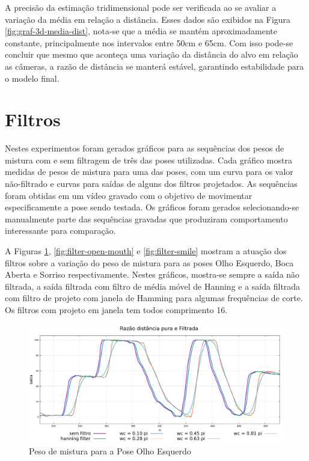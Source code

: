 A precisão da estimação tridimensional pode ser verificada ao se avaliar a
variação da média em relação a distância. Esses dados são exibidos na Figura
\ref{fig:graf-3d-media-dist}, nota-se que a média se mantém aproximadamente
constante, principalmente nos intervalos entre 50cm e 65cm. Com isso pode-se
concluir que mesmo que aconteça uma variação da distância do alvo em relação as
câmeras, a razão de distância se manterá estável, garantindo estabilidade para o
modelo final.

\section{Filtros}

Nestes experimentos foram gerados gráficos para as sequências dos pesos de
mistura com e sem filtragem de três das poses utilizadas. Cada gráfico mostra
medidas de pesos de mistura para uma das poses, com um curva para os valor
não-filtrado e curvas para saídas de alguns dos filtros projetados.  As
sequências foram obtidas em um vídeo gravado com o objetivo de movimentar
especificamente a pose sendo testada. Os gráficos foram gerados selecionando-se
manualmente parte das sequências gravadas que produziram comportamento
interessante para comparação.

A Figuras \ref{fig:filter-left-eye}, \ref{fig:filter-open-mouth} e
\ref{fig:filter-smile} mostram a atuação dos filtros sobre a variação do peso de
mistura para as poses Olho Esquerdo, Boca Aberta e Sorriso respectivamente.
Nestes gráficos, mostra-se sempre a saída não filtrada, a saída filtrada com
filtro de média móvel de Hanning e a saída filtrada com filtro de projeto com
janela de Hamming para algumas frequências de corte. Os filtros com projeto em
janela tem todos comprimento 16.

\begin{figure}[!htb]
\centering
\includegraphics[width=1.0\textwidth]{figs/filter-result-open-mouth.pdf} 
\caption{Peso de mistura para a Pose Olho Esquerdo}
\label{fig:filter-left-eye}
\end{figure}


